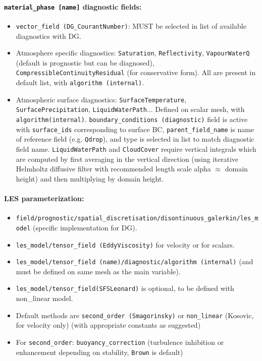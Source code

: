 \documentclass[10pt,a4paper]{article}
\begin{document}
\paragraph{\texttt{material\_phase [name]} diagnostic fields:}
\begin{itemize}
\item \texttt{vector\_field (DG\_CourantNumber)}: MUST be selected in list of available diagnostics with DG.
\item Atmosphere specific diagnostics: \texttt{Saturation}, \texttt{Reflectivity}, \texttt{VapourWaterQ} (default is prognostic but can be diagnosed), \texttt{CompressibleContinuityResidual} (for conservative form). All are present in default list, with \texttt{algorithm (internal)}.
\item Atmospheric surface diagnostics: \texttt{SurfaceTemperature}, \texttt{SurfacePrecipitation}, \texttt{LiquidWaterPath}... Defined on scalar mesh, with \texttt{algorithm(internal)}. \texttt{boundary\_conditions (diagnostic)} field is active with \texttt{surface\_ids} corresponding to surface BC, \texttt{parent\_field\_name} is name of reference field (e.g. \texttt{Qdrop}), and type is selected in list to match diagnostic field name. \texttt{LiquidWaterPath} and \texttt{CloudCover} require vertical integrals which are computed by first averaging in the vertical direction (using iterative Helmholtz diffusive filter with recommended length scale alpha $\approx$ domain height) and then multiplying by domain height.
\end{itemize}

\paragraph{LES parameterization:}
\begin{itemize}
\item \texttt{field/prognostic/spatial\_discretisation/disontinuous\_galerkin/les\_model} (specific implementation for DG).
\item \texttt{les\_model/tensor\_field (EddyViscosity)} for velocity or \texttt{} for scalars.
\item \texttt{les\_model/tensor\_field (name)/diagnostic/algorithm (internal)} (and must be defined on same mesh as the main variable).
\item \texttt{les\_model/tensor\_field(SFSLeonard)} is optional, to be defined with non\_linear model.
\item Default methods are \texttt{second\_order (Smagorinsky)} or \texttt{non\_linear} (Kosovic, for velocity only) (with appropriate constants as suggested)
\item For \texttt{second\_order}: \texttt{buoyancy\_correction} (turbulence inhibition or enhancement depending on stability, \texttt{Brown} is default)
\end{itemize}
\end{document}
